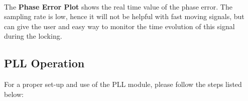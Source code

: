 \paragraph{} The \textbf{Phase Error Plot} shows the real time value of the phase error. The sampling rate is low, hence it will not be helpful with fast moving signals, but can give the user and easy way to monitor the time evolution of this signal during the locking.





\subsection{PLL Operation}  \label{PLL_operations_chapter}
For a proper set-up and use of the PLL module, please follow the steps listed below:
